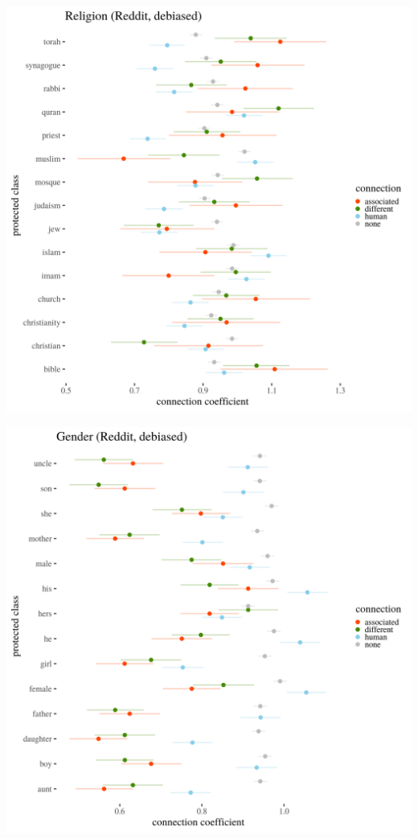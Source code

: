 \documentclass[12pt,]{book}
\begin{document}
\includegraphics[width=14cm]{../images/visDebReligionReddit.png}

\includegraphics[width=14cm]{../images/visDebGenderReddit.png}
\end{document}
